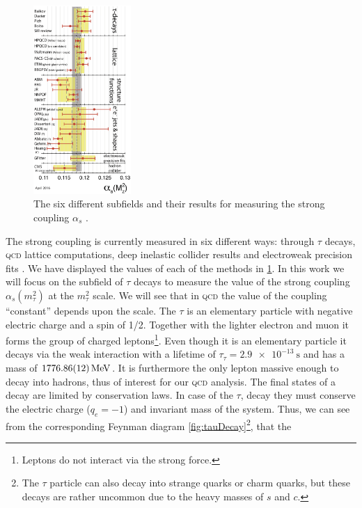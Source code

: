 \documentclass[../../index.tex]{subfiles}
\begin{document}
\begin{figure}
  \centering \vspace{-0.75cm}
  \includegraphics[width=0.33\textwidth]{./images/alphasDetermination.eps}
  \captionsetup{format=plain}
  \caption{The six different subfields and their results for measuring the
    strong coupling \(\alpha_s\) \cite{PDG2018}.}
  \label{fig:alphaSDetermination}
\end{figure}
The strong coupling is currently measured in six different ways: through
\(\tau\) decays, \textsc{qcd} lattice computations, deep inelastic collider
results and electroweak precision fits \cite{PDG2018}. We have displayed the
values of each of the methods in \cref{fig:alphaSDetermination}. In this work we
will focus on the subfield of \(\tau\) decays to measure the value of the strong
coupling \(\alpha_s(m_\tau^2)\) at the \(m_\tau^2\) scale. We will see that in
\textsc{qcd} the value of the coupling ``constant'' depends upon the scale. The
\(\tau\) is an elementary particle with negative electric charge and a spin of
1/2. Together with the lighter electron and muon it forms the group of charged
leptons\footnote{Leptons do not interact via the strong force.}. Even though it
is an elementary particle it decays via the weak interaction with a lifetime of
\(\tau_\tau=\SI{2.9e-13}{\second}\) and has a mass of
\(\SI{1776.86\pm0.12}{\mega\electronvolt}\)\cite{PDG2018}. It is furthermore the
only lepton massive enough to decay into hadrons, thus of interest for our
\textsc{qcd} analysis. The final states of a decay are limited by conservation
laws. In case of the \(\tau\), decay they must conserve the electric charge
(\(q_e=-1\)) and invariant mass of the system. Thus, we can see from the
corresponding Feynman diagram \cref{fig:tauDecay}\footnote{The \(\tau\) particle
  can also decay into strange quarks or charm quarks, but these decays are
  rather uncommon due to the heavy masses of \(s\) and \(c\).}, that the
\end{document}
